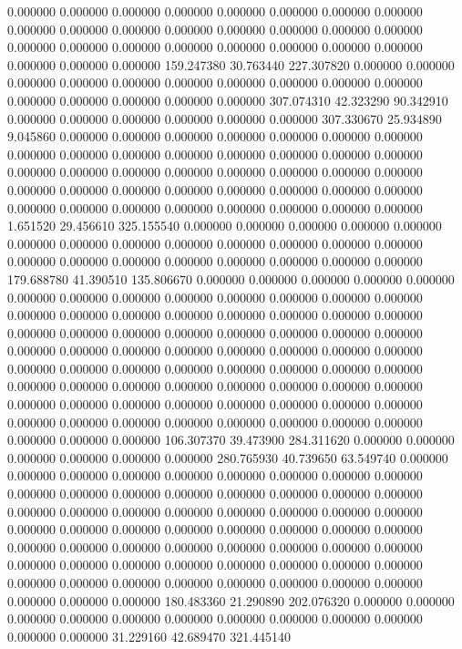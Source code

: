 0.000000 0.000000 0.000000
0.000000 0.000000 0.000000
0.000000 0.000000 0.000000
0.000000 0.000000 0.000000
0.000000 0.000000 0.000000
0.000000 0.000000 0.000000
0.000000 0.000000 0.000000
0.000000 0.000000 0.000000
0.000000 0.000000 0.000000
159.247380 30.763440 227.307820
0.000000 0.000000 0.000000
0.000000 0.000000 0.000000
0.000000 0.000000 0.000000
0.000000 0.000000 0.000000
0.000000 0.000000 0.000000
307.074310 42.323290 90.342910
0.000000 0.000000 0.000000
0.000000 0.000000 0.000000
307.330670 25.934890 9.045860
0.000000 0.000000 0.000000
0.000000 0.000000 0.000000
0.000000 0.000000 0.000000
0.000000 0.000000 0.000000
0.000000 0.000000 0.000000
0.000000 0.000000 0.000000
0.000000 0.000000 0.000000
0.000000 0.000000 0.000000
0.000000 0.000000 0.000000
0.000000 0.000000 0.000000
0.000000 0.000000 0.000000
0.000000 0.000000 0.000000
0.000000 0.000000 0.000000
1.651520 29.456610 325.155540
0.000000 0.000000 0.000000
0.000000 0.000000 0.000000
0.000000 0.000000 0.000000
0.000000 0.000000 0.000000
0.000000 0.000000 0.000000
0.000000 0.000000 0.000000
0.000000 0.000000 0.000000
179.688780 41.390510 135.806670
0.000000 0.000000 0.000000
0.000000 0.000000 0.000000
0.000000 0.000000 0.000000
0.000000 0.000000 0.000000
0.000000 0.000000 0.000000
0.000000 0.000000 0.000000
0.000000 0.000000 0.000000
0.000000 0.000000 0.000000
0.000000 0.000000 0.000000
0.000000 0.000000 0.000000
0.000000 0.000000 0.000000
0.000000 0.000000 0.000000
0.000000 0.000000 0.000000
0.000000 0.000000 0.000000
0.000000 0.000000 0.000000
0.000000 0.000000 0.000000
0.000000 0.000000 0.000000
0.000000 0.000000 0.000000
0.000000 0.000000 0.000000
0.000000 0.000000 0.000000
0.000000 0.000000 0.000000
0.000000 0.000000 0.000000
0.000000 0.000000 0.000000
0.000000 0.000000 0.000000
106.307370 39.473900 284.311620
0.000000 0.000000 0.000000
0.000000 0.000000 0.000000
280.765930 40.739650 63.549740
0.000000 0.000000 0.000000
0.000000 0.000000 0.000000
0.000000 0.000000 0.000000
0.000000 0.000000 0.000000
0.000000 0.000000 0.000000
0.000000 0.000000 0.000000
0.000000 0.000000 0.000000
0.000000 0.000000 0.000000
0.000000 0.000000 0.000000
0.000000 0.000000 0.000000
0.000000 0.000000 0.000000
0.000000 0.000000 0.000000
0.000000 0.000000 0.000000
0.000000 0.000000 0.000000
0.000000 0.000000 0.000000
0.000000 0.000000 0.000000
0.000000 0.000000 0.000000
0.000000 0.000000 0.000000
0.000000 0.000000 0.000000
0.000000 0.000000 0.000000
180.483360 21.290890 202.076320
0.000000 0.000000 0.000000
0.000000 0.000000 0.000000
0.000000 0.000000 0.000000
0.000000 0.000000 0.000000
31.229160 42.689470 321.445140
